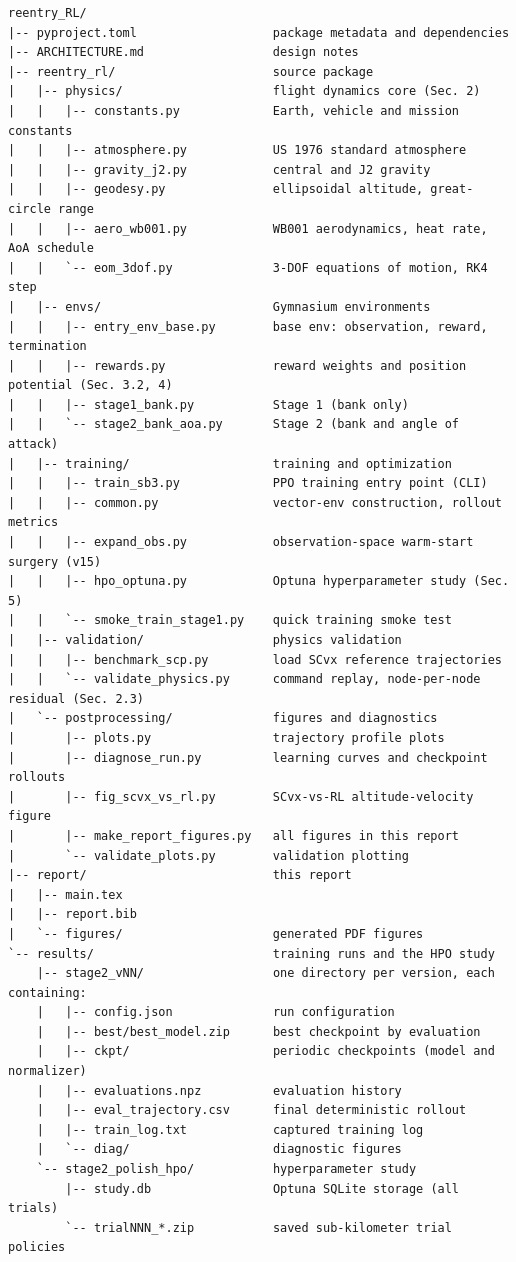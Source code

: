 \documentclass[11pt]{article}
\begin{document}
{\footnotesize
\begin{verbatim}
reentry_RL/
|-- pyproject.toml                   package metadata and dependencies
|-- ARCHITECTURE.md                  design notes
|-- reentry_rl/                      source package
|   |-- physics/                     flight dynamics core (Sec. 2)
|   |   |-- constants.py             Earth, vehicle and mission constants
|   |   |-- atmosphere.py            US 1976 standard atmosphere
|   |   |-- gravity_j2.py            central and J2 gravity
|   |   |-- geodesy.py               ellipsoidal altitude, great-circle range
|   |   |-- aero_wb001.py            WB001 aerodynamics, heat rate, AoA schedule
|   |   `-- eom_3dof.py              3-DOF equations of motion, RK4 step
|   |-- envs/                        Gymnasium environments
|   |   |-- entry_env_base.py        base env: observation, reward, termination
|   |   |-- rewards.py               reward weights and position potential (Sec. 3.2, 4)
|   |   |-- stage1_bank.py           Stage 1 (bank only)
|   |   `-- stage2_bank_aoa.py       Stage 2 (bank and angle of attack)
|   |-- training/                    training and optimization
|   |   |-- train_sb3.py             PPO training entry point (CLI)
|   |   |-- common.py                vector-env construction, rollout metrics
|   |   |-- expand_obs.py            observation-space warm-start surgery (v15)
|   |   |-- hpo_optuna.py            Optuna hyperparameter study (Sec. 5)
|   |   `-- smoke_train_stage1.py    quick training smoke test
|   |-- validation/                  physics validation
|   |   |-- benchmark_scp.py         load SCvx reference trajectories
|   |   `-- validate_physics.py      command replay, node-per-node residual (Sec. 2.3)
|   `-- postprocessing/              figures and diagnostics
|       |-- plots.py                 trajectory profile plots
|       |-- diagnose_run.py          learning curves and checkpoint rollouts
|       |-- fig_scvx_vs_rl.py        SCvx-vs-RL altitude-velocity figure
|       |-- make_report_figures.py   all figures in this report
|       `-- validate_plots.py        validation plotting
|-- report/                          this report
|   |-- main.tex
|   |-- report.bib
|   `-- figures/                     generated PDF figures
`-- results/                         training runs and the HPO study
    |-- stage2_vNN/                  one directory per version, each containing:
    |   |-- config.json              run configuration
    |   |-- best/best_model.zip      best checkpoint by evaluation
    |   |-- ckpt/                    periodic checkpoints (model and normalizer)
    |   |-- evaluations.npz          evaluation history
    |   |-- eval_trajectory.csv      final deterministic rollout
    |   |-- train_log.txt            captured training log
    |   `-- diag/                    diagnostic figures
    `-- stage2_polish_hpo/           hyperparameter study
        |-- study.db                 Optuna SQLite storage (all trials)
        `-- trialNNN_*.zip           saved sub-kilometer trial policies
\end{verbatim}
}



\end{document}
